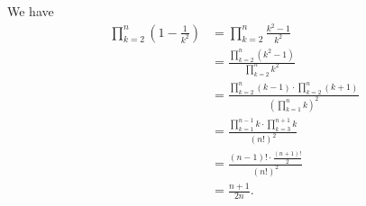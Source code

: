 We have
\begin{align*}
    \prod_{k=2}^n\left(1-\frac{1}{k^2}\right) &= \prod_{k=2}^n\frac{k^2-1}{k^2} \\[1mm]
    &= \frac{\prod_{k=2}^n(k^2-1)}{\prod_{k=2}^nk^2} \\[1mm]
    &= \frac{\prod_{k=2}^n(k-1)\cdot\prod_{k=2}^n(k+1)}{\left(\prod_{k=1}^nk\right)^2} \\[1mm]
    &= \frac{\prod_{k=1}^{n-1}k\cdot\prod_{k=3}^{n+1}k}{(n!)^2} \\
    &= \frac{(n-1)!\cdot\frac{(n+1)!}{2}}{(n!)^2} \\
    &= \frac{n+1}{2n}.
\end{align*}
